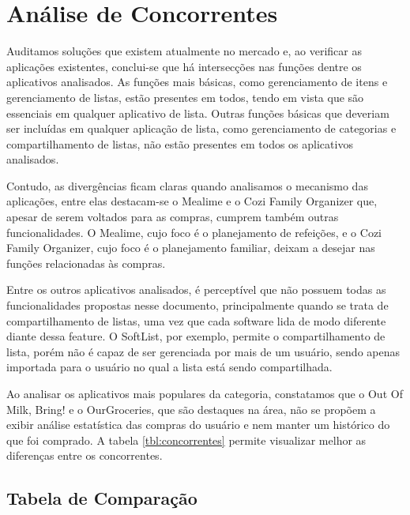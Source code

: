 \chapter{Análise de Concorrentes}

Auditamos soluções que existem atualmente no mercado e, ao verificar
as aplicações existentes, conclui-se que há intersecções nas funções
dentre os aplicativos analisados. As funções mais básicas, como
gerenciamento de itens e gerenciamento de listas, estão presentes em
todos, tendo em vista que são essenciais em qualquer aplicativo de
lista. Outras funções básicas que deveriam ser incluídas em qualquer
aplicação de lista, como gerenciamento de categorias e
compartilhamento de listas, não estão presentes em todos os
aplicativos analisados.

Contudo, as divergências ficam claras quando analisamos o mecanismo
das aplicações, entre elas destacam-se o Mealime e o Cozi Family
Organizer que, apesar de serem voltados para as compras, cumprem
também outras funcionalidades. O Mealime, cujo foco é o planejamento
de refeições, e o Cozi Family Organizer, cujo foco é o planejamento
familiar, deixam a desejar nas funções relacionadas às compras.

Entre os outros aplicativos analisados, é perceptível que não possuem
todas as funcionalidades propostas nesse documento, principalmente
quando se trata de compartilhamento de listas, uma vez que cada
software lida de modo diferente diante dessa feature. O SoftList, por
exemplo, permite o compartilhamento de lista, porém não é capaz de ser
gerenciada por mais de um usuário, sendo apenas importada para o
usuário no qual a lista está sendo compartilhada.

Ao analisar os aplicativos mais populares da categoria, constatamos
que o Out Of Milk, Bring! e o OurGroceries, que são destaques na área,
não se propõem a exibir análise estatística das compras do usuário e
nem manter um histórico do que foi comprado. A tabela \ref{tbl:concorrentes}
permite visualizar melhor as diferenças entre os concorrentes.

\pagebreak

\section{Tabela de Comparação}

